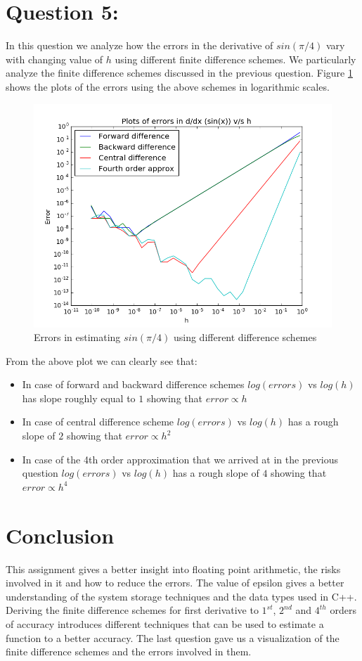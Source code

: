 \documentclass[11pt, a4paper]{article}
\begin{document}
\section{Question 5:}
\label{Question5}
In this question we analyze how the errors in the derivative of $sin(\pi/4)$ vary with changing value of $h$ using 
different finite difference schemes. We particularly analyze the finite difference schemes discussed in the previous 
question. Figure \ref{fig:Q5} shows the plots of the errors using the above schemes in logarithmic scales.
\begin{figure}[H]
 \centering
 \includegraphics[width = \textwidth]{Q5.png}
 \caption{Errors in estimating $sin(\pi/4)$ using different difference schemes}
 \label{fig:Q5}
\end{figure}

From the above plot we can clearly see that: 
\begin{itemize}
 \item In case of forward and backward difference schemes $log(errors)$ vs $log(h)$  has slope roughly equal to $1$ 
 showing that $error \propto h$
 \item In case of central difference scheme $log(errors)$ vs $log(h)$ has a rough slope of $2$ showing that $error \propto
 h^2$
 \item In case of the 4th order approximation that we arrived at in the previous question $log(errors)$ vs $log(h)$ has
 a rough slope of $4$ showing that $error \propto h^4$
\end{itemize}

\section{Conclusion}

This assignment gives a better insight into floating point arithmetic, the risks involved in it and how to reduce the 
errors. The value of epsilon gives a better understanding of the system storage techniques and the data types used in C++.
Deriving the finite difference schemes for first derivative to $1^{st}$, $2^{nd}$ and $4^{th}$ orders of accuracy 
introduces different techniques that can be used to estimate a function to a better accuracy. The last question gave us a
visualization of the finite difference schemes and the errors involved in them. 
\end{document}
